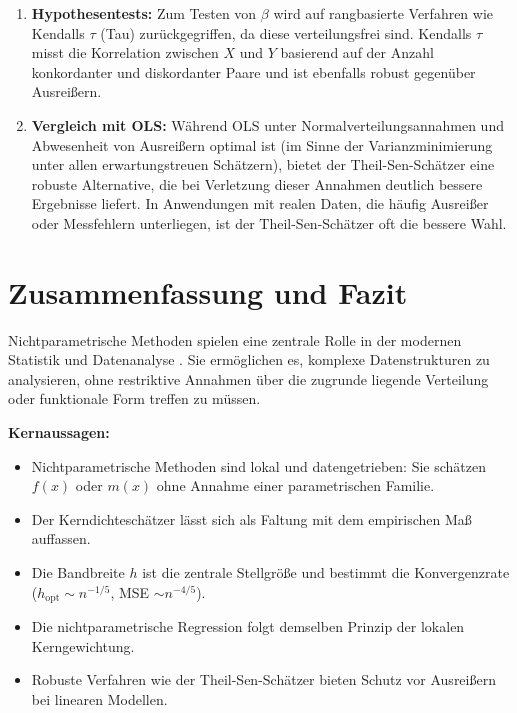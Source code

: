\documentclass[a4paper, 11pt]{scrartcl}
\begin{document}
\begin{enumerate}
	\item \textbf{Hypothesentests:} Zum Testen von $\beta$ wird auf rangbasierte Verfahren wie Kendalls $\tau$ \cite{Kendall1938} (Tau) zurückgegriffen, da diese verteilungsfrei sind. Kendalls $\tau$ misst die Korrelation zwischen $X$ und $Y$ basierend auf der Anzahl konkordanter und diskordanter Paare und ist ebenfalls robust gegenüber Ausreißern.
	
	\item \textbf{Vergleich mit OLS:} Während OLS unter Normalverteilungsannahmen und Abwesenheit von Ausreißern optimal ist (im Sinne der Varianzminimierung unter allen erwartungstreuen Schätzern), bietet der Theil-Sen-Schätzer eine robuste Alternative, die bei Verletzung dieser Annahmen deutlich bessere Ergebnisse liefert. In Anwendungen mit realen Daten, die häufig Ausreißer oder Messfehlern unterliegen, ist der Theil-Sen-Schätzer oft die bessere Wahl.
\end{enumerate}

\section{Zusammenfassung und Fazit}

Nichtparametrische Methoden spielen eine zentrale Rolle in der modernen Statistik und Datenanalyse \cite{BüningTrenkler+1994, Wasserman2006}. Sie ermöglichen es, komplexe Datenstrukturen zu analysieren, ohne restriktive Annahmen über die zugrunde liegende Verteilung oder funktionale Form treffen zu müssen.

\textbf{Kernaussagen:}
\begin{itemize}
	\item Nichtparametrische Methoden sind lokal und datengetrieben: Sie schätzen $f(x)$ oder $m(x)$ ohne Annahme einer parametrischen Familie.
	\item Der Kerndichteschätzer lässt sich als Faltung mit dem empirischen Maß auffassen.
	\item Die Bandbreite $h$ ist die zentrale Stellgröße und bestimmt die Konvergenzrate ($h_{\text{opt}} \sim n^{-1/5}$, MSE $\sim n^{-4/5}$).
	\item Die nichtparametrische Regression folgt demselben Prinzip der lokalen Kerngewichtung.
	\item Robuste Verfahren wie der Theil-Sen-Schätzer bieten Schutz vor Ausreißern bei linearen Modellen.
\end{itemize}
\end{document}
